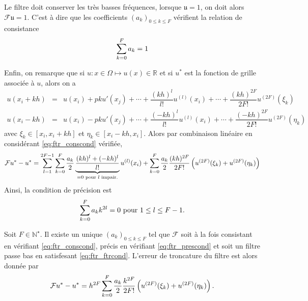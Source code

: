 Le filtre doit conserver les très basses fréquences, lorsque $\mathfrak{u} = \mathfrak{1}$, on doit alors $\mathcal{F}\mathfrak{u} = \mathfrak{1}$.
C'est à dire que les coefficients $(a_k)_{0 \leq k \leq F}$ vérifient la relation de consistance
\begin{equation}
\displaystyle\sum\limits_{k=0}^F a_k = 1
\label{eq:ftr_conscond}
\end{equation}

Enfin, on remarque que si $u : x \in \Omega \mapsto u(x) \in \mathbb{R}$ et si $u^*$ est la fonction de grille associée à $u$, alors on a 
\begin{equation}
\begin{array}{rcl}
u(x_i + kh) & = & u(x_i) + p k u'(x_j) + \cdots + \dfrac{(kh)^l}{l!}u^{(l)}(x_i) + \cdots +\dfrac{(kh)^{2F}}{2F!} u^{(2F)}(\xi_k)\\
u(x_i - kh) & = & u(x_i) - p k u'(x_j) + \cdots + \dfrac{(-kh)^l}{l!}u^{(l)}(x_i) + \cdots +\dfrac{(-kh)^{2F}}{2F!} u^{(2F)}(\eta_k)
\end{array}
\end{equation}
avec $\xi_k \in [x_i, x_i+kh]$ et $\eta_k \in [x_i-kh, x_i]$. Alors par combinaison linéaire en considérant \eqref{eq:ftr_conscond} vérifiée, 
\begin{equation}
\mathcal{F}u^* - u^* = \displaystyle\sum\limits_{l=1}^{2F-1} \displaystyle\sum\limits_{k=0}^F \dfrac{a_k}{2} \underbrace{\dfrac{(kh)^l + (-kh)^l}{l!}}_{=0 \text{ pour } l \text{ impair.}}u^{(l)}(x_i) + \displaystyle\sum\limits_{k=0}^F \dfrac{a_k}{2}\dfrac{(kh)^{2F}}{2F!} \left( u^{(2F)}(\xi_k) + u^{(2F)}(\eta_k) \right)
\end{equation}
Ainsi, la condition de précision est 
\begin{equation}
\displaystyle\sum\limits_{k=0}^F a_k k^{2l} = 0 \text{ pour } 1 \leq l \leq F-1.
\label{eq:ftr_prescond}
\end{equation}

\begin{theoreme}
Soit $F \in \mathbb{N}^{\star}$. Il existe un unique $(a_k)_{0 \leq k \leq F}$ tel que $\mathcal{F}$ soit à la fois consistant en vérifiant \eqref{eq:ftr_conscond}, précis en vérifiant \eqref{eq:ftr_prescond} et soit un filtre passe bas en satisfesant \eqref{eq:ftr_ftrcond}. L'erreur de troncature du filtre est alors donnée par 
\begin{equation}
\mathcal{F}u^* - u^* = h^{2F} \displaystyle\sum\limits_{k=0}^F \dfrac{a_k}{2} \dfrac{k^{2F}}{2F!} \left( u^{(2F)}(\xi_k) + u^{(2F)}(\eta_k) \right).
\end{equation}
\end{theoreme}

